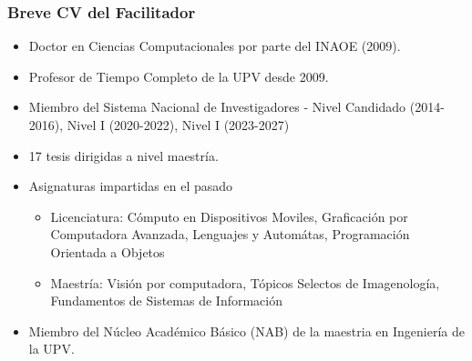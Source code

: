 
\begin{frame}

\frametitle{Breve CV del Facilitador}
\begin{itemize}
\item Doctor en Ciencias Computacionales por parte del INAOE (2009).  
\item Profesor de Tiempo Completo de la UPV desde 2009.  
\item Miembro del Sistema Nacional de Investigadores - Nivel Candidado (2014-2016), Nivel I (2020-2022), Nivel I (2023-2027)
\item 17 tesis dirigidas a nivel maestría.
\item Asignaturas impartidas en el pasado 
\begin{itemize}
\item Licenciatura: Cómputo en Dispositivos Moviles, Graficación por Computadora Avanzada, Lenguajes y Automátas, Programación Orientada a Objetos
\item Maestr\'ia: Visi\'on por computadora, T\'opicos Selectos de Imagenolog\'ia, Fundamentos de Sistemas de Informaci\'on
\end{itemize}
\item Miembro del N\'ucleo Acad\'emico B\'asico (NAB) de la maestria en Ingeniería de la UPV.
\end{itemize}
\end{frame}
